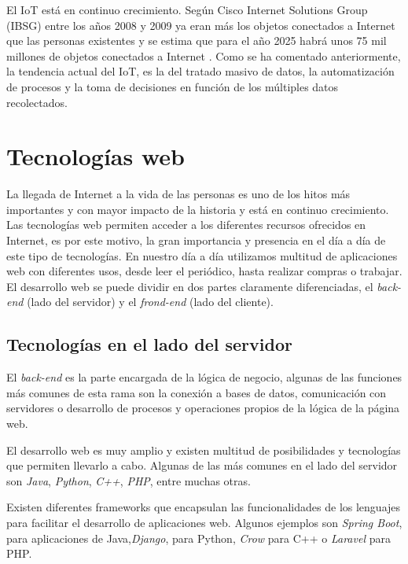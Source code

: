 \documentclass[a4paper, 12pt, oneside]{book}
\begin{document}
El IoT está en continuo crecimiento. Según Cisco Internet Solutions Group (IBSG) entre los años 2008 y 2009 ya eran más los objetos conectados a Internet que las personas existentes y se estima que para el año 2025 habrá unos 75 mil millones de objetos conectados a Internet \cite{cisco_iot}. Como se ha comentado anteriormente, la tendencia actual del IoT, es la del tratado masivo de datos, la automatización de procesos y la toma de decisiones en función de los múltiples datos recolectados.

\section{Tecnologías web}
\label{sec:tecnologías web}
La llegada de Internet a la vida de las personas es uno de los hitos más importantes y con mayor impacto de la historia y está en continuo crecimiento. Las tecnologías web permiten acceder a los diferentes recursos ofrecidos en Internet, es por este motivo, la gran importancia y presencia en el día a día de este tipo de tecnologías. En nuestro día a día utilizamos multitud de aplicaciones web con diferentes usos, desde leer el periódico, hasta realizar compras o trabajar.
El desarrollo web se puede dividir en dos partes claramente diferenciadas, el \textit{back-end} (lado del servidor) y el \textit{frond-end} (lado del cliente).

\subsection{Tecnologías en el lado del servidor}
\label{subsec:tecnologías en el lado del servidor}
 El \textit{back-end} es la parte encargada de la lógica de negocio, algunas de las funciones más comunes de esta rama son la conexión a bases de datos, comunicación con servidores o desarrollo de procesos y operaciones propios de la lógica de la página web.
 
El desarrollo web es muy amplio y existen multitud de posibilidades y tecnologías que permiten llevarlo a cabo. Algunas de las más comunes en el lado del servidor son \textit{Java}, \textit{Python}, \textit{C++}, \textit{PHP}, entre muchas otras.

Existen diferentes frameworks que encapsulan las funcionalidades de los lenguajes para facilitar el desarrollo de aplicaciones web. Algunos ejemplos son \textit{Spring Boot}, para aplicaciones de Java,\textit{Django}, para Python, \textit{Crow} para C++ o \textit{Laravel} para PHP.
\end{document}
